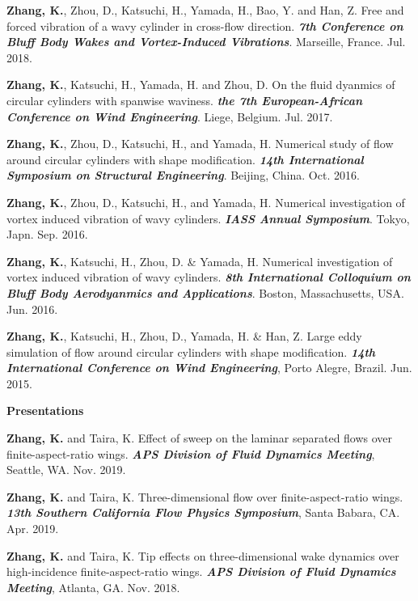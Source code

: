 \documentclass[10pt]{article}
\begin{document}
{\begin{etaremune}
\item \textbf{Zhang, K.}, Zhou, D., Katsuchi, H., Yamada, H., Bao, Y. and Han, Z. Free and forced vibration of a wavy cylinder in cross-flow direction. \textit{\textbf{7th Conference on Bluff Body Wakes and Vortex-Induced Vibrations}}. Marseille, France. Jul. 2018.

\item \textbf{Zhang, K.}, Katsuchi, H., Yamada, H. and Zhou, D. On the fluid dyanmics of circular cylinders with spanwise waviness. \textit{\textbf{the 7th European-African Conference on Wind Engineering}}. Liege, Belgium. Jul. 2017.

\item \textbf{Zhang, K.}, Zhou, D., Katsuchi, H., and Yamada, H. Numerical study of flow around circular cylinders with shape modification. \textit{\textbf{14th International Symposium on Structural Engineering}}. Beijing, China. Oct. 2016.

\item \textbf{Zhang, K.}, Zhou, D., Katsuchi, H., and Yamada, H. Numerical investigation of vortex induced vibration of wavy cylinders. \textit{\textbf{IASS Annual Symposium}}. Tokyo, Japn. Sep. 2016.

\item \textbf{Zhang, K.}, Katsuchi, H., Zhou, D. \& Yamada, H. Numerical investigation of vortex induced vibration of wavy cylinders. \textit{\textbf{8th International Colloquium on Bluff Body Aerodyanmics and Applications}}. Boston, Massachusetts, USA. Jun. 2016.

\item \textbf{Zhang, K.}, Katsuchi, H., Zhou, D., Yamada, H. \& Han, Z. Large eddy simulation of flow around circular cylinders with shape modification. \textit{\textbf{14th International Conference on Wind Engineering}}, Porto Alegre, Brazil. Jun. 2015.

\end{etaremune}

}

{\bf \color{Blue}Presentations} 

{\small
\begin{etaremune}

\item \textbf{Zhang, K.} and Taira, K. Effect of sweep on the laminar separated flows over finite-aspect-ratio wings. \textit{\textbf{APS Division of Fluid Dynamics Meeting}}, Seattle, WA. Nov. 2019.

\item \textbf{Zhang, K.} and Taira, K. Three-dimensional flow over finite-aspect-ratio wings. \textit{\textbf{13th Southern California Flow Physics Symposium}}, Santa Babara, CA. Apr. 2019.

\item \textbf{Zhang, K.} and Taira, K. Tip effects on three-dimensional wake dynamics over high-incidence finite-aspect-ratio wings. \textit{\textbf{APS Division of Fluid Dynamics Meeting}}, Atlanta, GA. Nov. 2018.

\end{etaremune}
}
\end{document}
